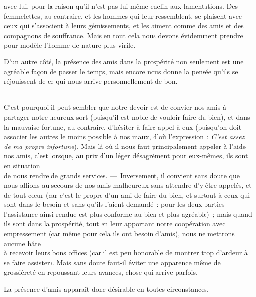 \documentclass[french,twoside]{book} %
\begin{document}
avec lui, pour la raison qu’il n’est pas lui-même enclin aux lamentations. Des femmelettes, au contraire, et les hommes qui leur ressemblent, se plaisent avec ceux qui s’associent à leurs gémissements, et les aiment comme des amis et des compagnons de souffrance. Mais en tout cela nous devons évidemment prendre pour modèle l’homme de nature plus virile.\par
D’un autre côté, la présence des amis dans la prospérité non seulement est une agréable façon de passer le temps, mais encore nous donne la pensée qu’ils se réjouissent de ce qui nous arrive personnellement de bon.\par
\\
C’est pourquoi il peut sembler que notre devoir est de convier nos amis à partager notre heureux sort (puisqu’il est noble de vouloir faire du bien), et dans la mauvaise fortune, au contraire, d’hésiter à faire appel à eux (puisqu’on doit associer les autres le moins possible à nos maux, d’où l’expression : {\itshape C’est assez de ma propre infortune}). Mais là où il nous faut principalement appeler à l’aide nos amis, c’est lorsque, au prix d’un léger désagrément pour eux-mêmes, ils sont en situation \\
de nous rendre de grands services. — Inversement, il convient sans doute que nous allions au secours de nos amis malheureux sans attendre d’y être appelés, et de tout cœur (car c’est le propre d’un ami de faire du bien, et surtout à ceux qui sont dans le besoin et sans qu’ils l’aient demandé : pour les deux parties l’assistance ainsi rendue est plus conforme au bien et plus agréable) ; mais quand ils sont dans la prospérité, tout en leur apportant notre coopération avec empressement (car même pour cela ils ont besoin d’amis), nous ne mettrons aucune hâte \\
à recevoir leurs bons offices (car il est peu honorable de montrer trop d’ardeur à se faire assister). Mais sans doute faut-il éviter une apparence même de grossièreté en repoussant leurs avances, chose qui arrive parfois.\par
La présence d’amis apparaît donc désirable en toutes circonstances.
\end{document}
